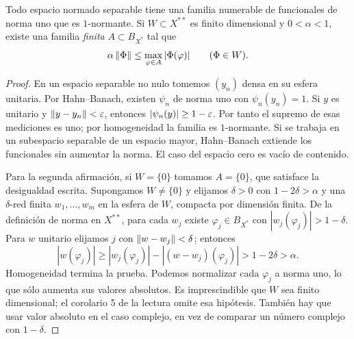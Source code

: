 \begin{lema}\label{v3:normantes-finitos}
Todo espacio normado separable tiene una familia numerable de funcionales de norma uno que es $1$-normante. Si $W\subset X^{**}$ es finito dimensional y $0<\alpha<1$, existe una familia \emph{finita} $A\subset B_{X^*}$ tal que
\[
 \alpha\left\lVert\Phi\right\rVert\leq\max_{\varphi\in A}|\Phi(\varphi)|\qquad(\Phi\in W).
\]
\end{lema}
\begin{proof}
En un espacio separable no nulo tomemos $(y_n)$ densa en su esfera unitaria. Por Hahn--Banach, existen $\psi_n$ de norma uno con $\psi_n(y_n)=1$. Si $y$ es unitario y $\left\lVert y-y_n\right\rVert<\varepsilon$, entonces
$|\psi_n(y)|\geq1-\varepsilon$. Por tanto el supremo de esas mediciones es uno; por homogeneidad la familia es $1$-normante. Si se trabaja en un subespacio separable de un espacio mayor, Hahn--Banach extiende los funcionales sin aumentar la norma. El caso del espacio cero es vacío de contenido.

Para la segunda afirmación, si $W=\{0\}$ tomamos $A=\{0\}$, que satisface la desigualdad escrita. Supongamos $W\ne\{0\}$ y elijamos $\delta>0$ con $1-2\delta>\alpha$ y una $\delta$-red finita $w_1,\ldots,w_m$ en la esfera de $W$, compacta por dimensión finita. De la definición de norma en $X^{**}$, para cada $w_j$ existe $\varphi_j\in B_{X^*}$ con $|w_j(\varphi_j)|>1-\delta$. Para $w$ unitario elijamos $j$ con $\left\lVert w-w_j\right\rVert<\delta$; entonces
\[
 |w(\varphi_j)|\geq|w_j(\varphi_j)|-|(w-w_j)(\varphi_j)|>1-2\delta>\alpha.
\]
Homogeneidad termina la prueba. Podemos normalizar cada $\varphi_j$ a norma uno, lo que sólo aumenta sus valores absolutos. Es imprescindible que $W$ sea finito dimensional; el corolario 5 de la lectura omite esa hipótesis. También hay que usar valor absoluto en el caso complejo, en vez de comparar un número complejo con $1-\delta$.
\end{proof}

